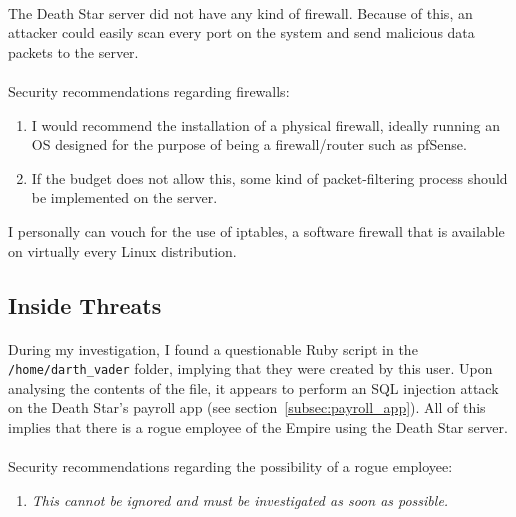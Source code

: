 \documentclass{article}
\begin{document}
\paragraph{}
The Death Star server did not have any kind of firewall.
Because of this, an attacker could easily scan every port on the system and send malicious data packets to the server.

\paragraph{}
\begin{adjustwidth}{1.5cm}{1.5cm}
	Security recommendations regarding firewalls:
	\begin{enumerate}
		\item I would recommend the installation of a physical firewall, ideally running an OS designed for the purpose of being a firewall/router such as pfSense.
		\item If the budget does not allow this, some kind of packet-filtering process should be implemented on the server.
	\end{enumerate}
	I personally can vouch for the use of iptables, a software firewall that is available on virtually every Linux distribution.
\end{adjustwidth}
\subsection{Inside Threats}
\label{subsec:inside_threats}
\paragraph{}
During my investigation, I found a questionable Ruby script in the \texttt{/home/darth\_vader} folder, implying that they were created by this user.
Upon analysing the contents of the file, it appears to perform an SQL injection attack on the Death Star's payroll app (see section~\ref{subsec:payroll_app}).
All of this implies that there is a rogue employee of the Empire using the Death Star server.

\paragraph{}
\begin{adjustwidth}{1.5cm}{1.5cm}
	Security recommendations regarding the possibility of a rogue employee:
	\begin{enumerate}
		\item \emph{This cannot be ignored and must be investigated as soon as possible.} 
	\end{enumerate}
\end{adjustwidth}
\end{document}
